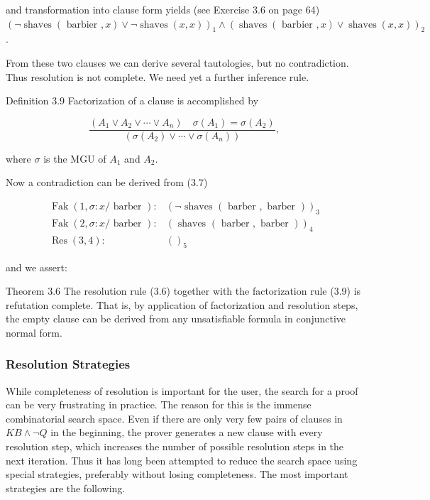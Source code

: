 \documentclass[10pt]{book}
\begin{document}
and transformation into clause form yields (see Exercise 3.6 on page 64)\\
$(\neg \operatorname{shaves}(\text { barbier }, x) \vee \neg \operatorname{shaves}(x, x))_{1} \wedge(\operatorname{shaves}(\text { barbier }, x) \vee \operatorname{shaves}(x, x))_{2}$.

From these two clauses we can derive several tautologies, but no contradiction. Thus resolution is not complete. We need yet a further inference rule.

Definition 3.9 Factorization of a clause is accomplished by

$$
\frac{\left(A_{1} \vee A_{2} \vee \cdots \vee A_{n}\right) \quad \sigma\left(A_{1}\right)=\sigma\left(A_{2}\right)}{\left(\sigma\left(A_{2}\right) \vee \cdots \vee \sigma\left(A_{n}\right)\right)},
$$

where $\sigma$ is the MGU of $A_{1}$ and $A_{2}$.

Now a contradiction can be derived from (3.7)

$$
\begin{aligned}
\operatorname{Fak}(1, \sigma: x / \text { barber }): & (\neg \text { shaves }(\text { barber }, \text { barber }))_{3} \\
\operatorname{Fak}(2, \sigma: x / \text { barber }): & (\text { shaves }(\text { barber }, \text { barber }))_{4} \\
\operatorname{Res}(3,4): & ()_{5}
\end{aligned}
$$

and we assert:

Theorem 3.6 The resolution rule (3.6) together with the factorization rule (3.9) is refutation complete. That is, by application of factorization and resolution steps, the empty clause can be derived from any unsatisfiable formula in conjunctive normal form.

\subsubsection*{Resolution Strategies}
While completeness of resolution is important for the user, the search for a proof can be very frustrating in practice. The reason for this is the immense combinatorial search space. Even if there are only very few pairs of clauses in $K B \wedge \neg Q$ in the beginning, the prover generates a new clause with every resolution step, which increases the number of possible resolution steps in the next iteration. Thus it has long been attempted to reduce the search space using special strategies, preferably without losing completeness. The most important strategies are the following.
\end{document}
